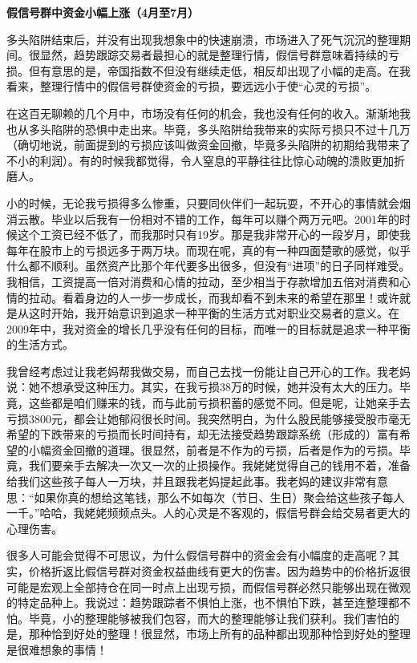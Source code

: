 \textbf{假信号群中资金小幅上涨（4月至7月）}

多头陷阱结束后，并没有出现我想象中的快速崩溃，市场进入了死气沉沉的整理期间。很显然，趋势跟踪交易者最担心的就是整理行情，假信号群意味着持续的亏损。但有意思的是，帝国指数不但没有继续走低，相反却出现了小幅的走高。在我看来，整理行情中的假信号群使资金的亏损，要远远小于使“心灵的亏损”。

在这百无聊赖的几个月中，市场没有任何的机会，我也没有任何的收入。渐渐地我也从多头陷阱的恐惧中走出来。毕竟，多头陷阱给我带来的实际亏损只不过十几万（确切地说，前面提到的亏损应该叫做资金回撤，毕竟多头陷阱的初期给我带来了不小的利润）。有的时候我都觉得，令人窒息的平静往往比惊心动魄的溃败更加折磨人。

小的时候，无论我亏损得多么惨重，只要同伙伴们一起玩耍，不开心的事情就会烟消云散。毕业以后我有一份相对不错的工作，每年可以赚个两万元吧。2001年的时候这个工资已经不低了，而我那时只有19岁。那是我非常开心的一段岁月，即使我每年在股市上的亏损远多于两万块。而现在呢，真的有一种四面楚歌的感觉，似乎什么都不顺利。虽然资产比那个年代要多出很多，但没有“进项”的日子同样难受。我相信，工资提高一倍对消费和心情的拉动，至少相当于存款增加五倍对消费和心情的拉动。看着身边的人一步一步成长，而我却看不到未来的希望在那里！或许就是从这时开始，我开始意识到追求一种平衡的生活方式对职业交易者的意义。在2009年中，我对资金的增长几乎没有任何的目标，而唯一的目标就是追求一种平衡的生活方式。

我曾经考虑过让我老妈帮我做交易，而自己去找一份能让自己开心的工作。我老妈说：她不想承受这种压力。其实，在我亏损38万的时候，她并没有太大的压力。毕竟，这些都是咱们赚来的钱，而与此前亏损积蓄的感觉不同。但是呢，让她亲手去亏损3800元，都会让她郁闷很长时间。我突然明白，为什么股民能够接受股市毫无希望的下跌带来的亏损而长时间持有，却无法接受趋势跟踪系统（形成的）富有希望的小幅资金回撤的道理。很显然，前者是不作为的亏损，后者是作为的亏损。毕竟，我们要亲手去解决一次又一次的止损操作。我姥姥觉得自己的钱用不着，准备给我们这些孩子每人一万块，并且跟我老妈提起此事。我老妈的建议非常有意思：“如果你真的想给这笔钱，那么不如每次（节日、生日）聚会给这些孩子每人一千。”哈哈，我姥姥频频点头。人的心灵是不客观的，假信号群会给交易者更大的心理伤害。

很多人可能会觉得不可思议，为什么假信号群中的资金会有小幅度的走高呢？其实，价格折返比假信号群对资金权益曲线有更大的伤害。因为趋势中的价格折返很可能是宏观上全部持仓在同一时点上出现亏损，而假信号群必然只能够出现在微观的特定品种上。我说过：趋势跟踪者不惧怕上涨，也不惧怕下跌，甚至连整理都不怕。毕竟，小的整理能够被我们包容，而大的整理能够让我们获利。我们害怕的是，那种恰到好处的整理！很显然，市场上所有的品种都出现那种恰到好处的整理是很难想象的事情！

